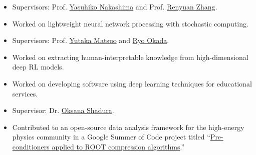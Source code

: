 \documentclass[10pt]{extarticle}
\begin{document}
\begin{itemize}
    \item Supervisors: Prof. \href{https://scholar.google.com/citations?user=Tp_fVdEAAAAJ&hl=en}{Yasuhiko Nakashima} and Prof. \href{https://scholar.google.com/citations?user=f8UqgYIAAAAJ&hl=en}{Renyuan Zhang}.
    \item Worked on lightweight neural network processing with stochastic computing.
\end{itemize}

\begin{itemize}
    \item Supervisors: Prof. \href{http://ymatsuo.com/index.html}{Yutaka Matsuo} and \href{https://www.linkedin.com/in/ryookada-5298765a/}{Ryo Okada}.
    \item Worked on extracting human-interpretable knowledge from high-dimensional deep RL models.
\end{itemize}

\begin{itemize}
    \item Worked on developing software using deep learning techniques for educational services.
\end{itemize}

\begin{itemize}
    \item Supervisor: Dr. \href{https://github.com/oshadura}{Oksana Shadura}.
    \item Contributed to an open-source data analysis framework for the high-energy physics community in a Google Summer of Code project titled ``\href{https://kamahori.github.io/gsoc2020/}{Pre-conditioners applied to ROOT compression algorithms}.''
\end{itemize}
\end{document}
